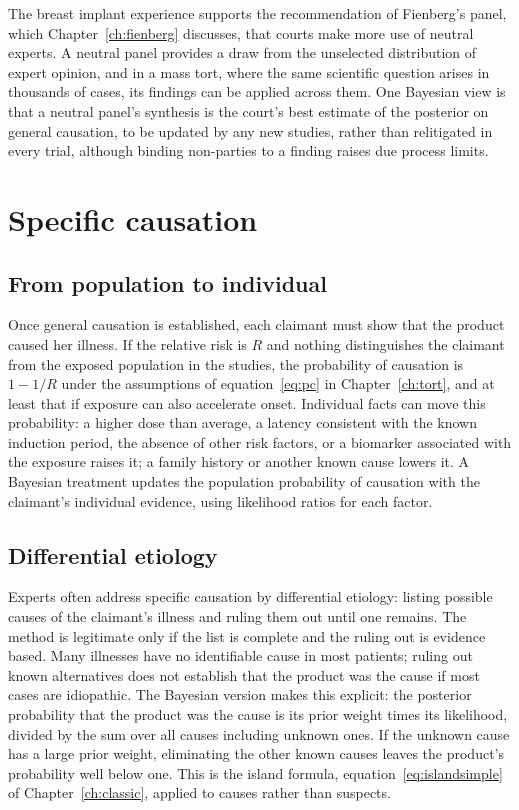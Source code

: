 The breast implant experience supports the recommendation of Fienberg's panel, which Chapter~\ref{ch:fienberg} discusses, that courts make more use of neutral experts. A neutral panel provides a draw from the unselected distribution of expert opinion, and in a mass tort, where the same scientific question arises in thousands of cases, its findings can be applied across them. One Bayesian view is that a neutral panel's synthesis is the court's best estimate of the posterior on general causation, to be updated by any new studies, rather than relitigated in every trial, although binding non-parties to a finding raises due process limits.

\section{Specific causation}

\subsection{From population to individual}

Once general causation is established, each claimant must show that the product caused her illness. If the relative risk is $R$ and nothing distinguishes the claimant from the exposed population in the studies, the probability of causation is $1 - 1/R$ under the assumptions of equation~\eqref{eq:pc} in Chapter~\ref{ch:tort}, and at least that if exposure can also accelerate onset. Individual facts can move this probability: a higher dose than average, a latency consistent with the known induction period, the absence of other risk factors, or a biomarker associated with the exposure raises it; a family history or another known cause lowers it. A Bayesian treatment updates the population probability of causation with the claimant's individual evidence, using likelihood ratios for each factor.

\subsection{Differential etiology}

Experts often address specific causation by differential etiology: listing possible causes of the claimant's illness and ruling them out until one remains. The method is legitimate only if the list is complete and the ruling out is evidence based. Many illnesses have no identifiable cause in most patients; ruling out known alternatives does not establish that the product was the cause if most cases are idiopathic. The Bayesian version makes this explicit: the posterior probability that the product was the cause is its prior weight times its likelihood, divided by the sum over all causes including unknown ones. If the unknown cause has a large prior weight, eliminating the other known causes leaves the product's probability well below one. This is the island formula, equation~\eqref{eq:islandsimple} of Chapter~\ref{ch:classic}, applied to causes rather than suspects.

